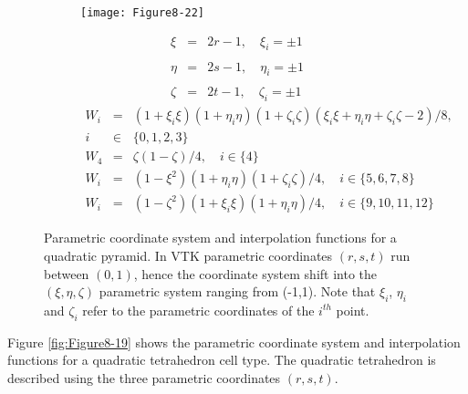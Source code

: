 \begin{description}[leftmargin=0cm,labelindent=0cm]
    \begin{figure}[!htb]
        \centering
        \begin{subfigure}{0.48\linewidth}
            \centering
            \texttt{[image: Figure8-22]}
            \caption*{}
        \end{subfigure}
        \hfill
        \begin{subfigure}{0.48\linewidth}
            \centering
            \begin{equation*}
            \begin{array}{lll}
            \xi &=& 2 r - 1, \quad \xi_i = \pm1 \\ \\
            \eta &=& 2 s - 1, \quad \eta_i = \pm1 \\ \\
            \zeta &=& 2 t - 1, \quad \zeta_i = \pm1
            \end{array}
            \end{equation*}
            \begin{equation*}
            \begin{array}{lll}
            W_i &=& (1 + \xi_i \xi)(1 + \eta_i \eta)(1 + \zeta_i \zeta)(\xi_i \xi + \eta_i \eta + \zeta_i \zeta - 2)/8, \\
            i &\in& \lbrace 0, 1, 2, 3 \rbrace \\
            W_4 &=& \zeta(1 - \zeta)/4, \quad i \in \lbrace 4 \rbrace \\
            W_i &=& (1 - \xi^2)(1 + \eta_i \eta)(1 + \zeta_i \zeta)/4, \quad i \in \lbrace 5, 6, 7, 8\rbrace \\
            W_i &=& (1 - \zeta^2)(1 + \xi_i \xi)(1 + \eta_i \eta)/4, \quad i \in \lbrace 9, 10, 11, 12 \rbrace
            \end{array}
            \end{equation*}
        \end{subfigure}%
        \caption{Parametric coordinate system and interpolation functions for a quadratic pyramid. In VTK parametric coordinates $(r,s,t)$ run between $(0,1)$, hence the coordinate system shift into the $(\xi, \eta, \zeta)$ parametric system ranging from (-1,1). Note that $\xi_i$, $\eta_i$ and $\zeta_i$ refer to the parametric coordinates of the $i^{th}$ point.}
        \label{fig:Figure8-22}
    \end{figure}

    \item[Quadratic Tetrahedron.\index{interpolation function!quadratic tetrahedron}] Figure \ref{fig:Figure8-19} shows the parametric coordinate system and interpolation functions for a quadratic tetrahedron cell type. The quadratic tetrahedron is described using the three parametric coordinates $(r,s,t)$.


\end{description}
